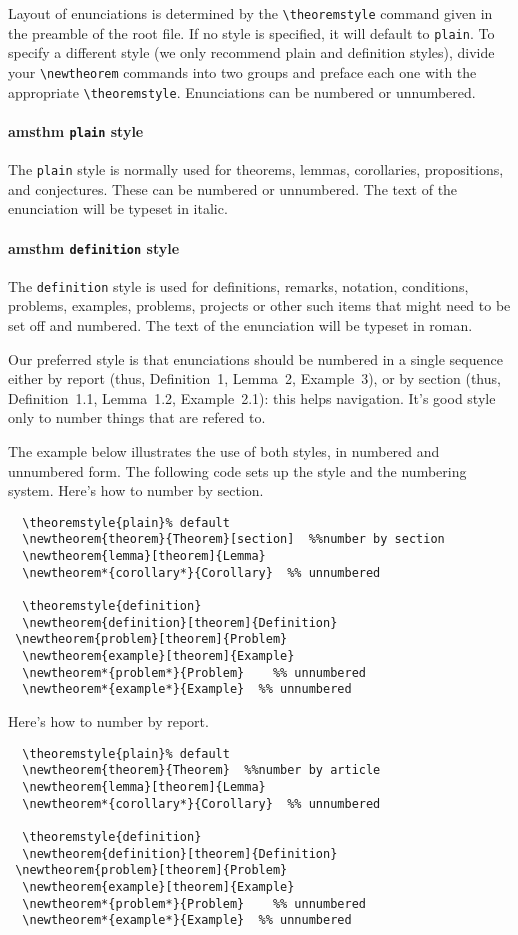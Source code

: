 \documentclass{MIIR}
\theoremstyle{plain}
\theoremstyle{definition}
\begin{document}
Layout of enunciations is determined by the \verb"\theoremstyle" command
given in the preamble of the root file. If no style is specified, it will default to \texttt{plain}.
To specify a different style (we only recommend plain and definition styles),
divide your \verb"\newtheorem" commands
into two groups and preface each one with the appropriate \verb"\theoremstyle".
Enunciations can be numbered or unnumbered.

\paragraph{amsthm \texttt{plain} style}
The \texttt{plain} style is normally used for theorems, lemmas,
corollaries, propositions, and conjectures. These can be numbered or unnumbered. The text of the enunciation will be typeset in italic.

\paragraph{amsthm \texttt{definition} style}
The \texttt{definition} style is used for definitions,
remarks, notation, conditions, problems, examples, problems, projects or other such items that might need to be set off and numbered. The text of the enunciation will be typeset in roman.


Our preferred style is that enunciations should be numbered in a single
sequence either by report (thus, Definition~1, Lemma~2,
Example~3), or by section (thus, Definition~1.1, Lemma~1.2, 
Example~2.1): this helps navigation. 
It's good style only to number things that are refered to. 

The example below illustrates the use of both styles, in numbered and unnumbered form.
The following code sets up the style and the numbering system. Here's how to number by section.

\begin{verbatim}
  \theoremstyle{plain}% default
  \newtheorem{theorem}{Theorem}[section]  %%number by section
  \newtheorem{lemma}[theorem]{Lemma}
  \newtheorem*{corollary*}{Corollary}  %% unnumbered

  \theoremstyle{definition}
  \newtheorem{definition}[theorem]{Definition}
 \newtheorem{problem}[theorem]{Problem}
  \newtheorem{example}[theorem]{Example}
  \newtheorem*{problem*}{Problem}    %% unnumbered
  \newtheorem*{example*}{Example}  %% unnumbered
\end{verbatim}


Here's how to number by report.
\begin{verbatim}
  \theoremstyle{plain}% default
  \newtheorem{theorem}{Theorem}  %%number by article
  \newtheorem{lemma}[theorem]{Lemma}
  \newtheorem*{corollary*}{Corollary}  %% unnumbered

  \theoremstyle{definition}
  \newtheorem{definition}[theorem]{Definition}
 \newtheorem{problem}[theorem]{Problem}
  \newtheorem{example}[theorem]{Example}
  \newtheorem*{problem*}{Problem}    %% unnumbered
  \newtheorem*{example*}{Example}  %% unnumbered
\end{verbatim}
\end{document}
